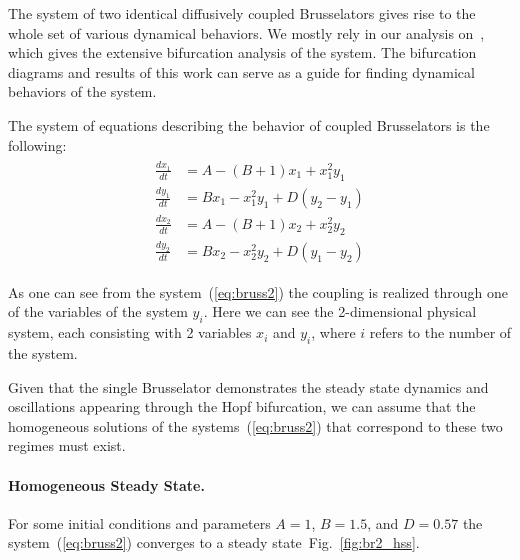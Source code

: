 \documentclass[11pt,a4paper]{article}
\begin{document}
The system of two identical diffusively coupled Brusselators gives rise to the whole
set of various dynamical behaviors. We mostly rely in our analysis
on~\cite{VolkovBruss2}, which gives the extensive bifurcation analysis of the
system. The bifurcation diagrams and results of this work can serve as a guide for
finding dynamical behaviors of the system.

The system of equations describing the behavior of coupled Brusselators is the
following:
\begin{align}
  \label{eq:bruss2}
  \begin{split}
    \frac{dx_1}{dt} &= A-(B+1)x_1+x_1^2y_1 \\
    \frac{dy_1}{dt} &= Bx_1-x_1^2y_1 + D(y_2-y_1)\\
    \frac{dx_2}{dt} &= A-(B+1)x_2+x_2^2y_2 \\
    \frac{dy_2}{dt} &= Bx_2-x_2^2y_2 + D(y_1-y_2)
  \end{split}
\end{align}

As one can see from the system~(\ref{eq:bruss2}) the coupling is realized through one
of the variables of the system $y_i$. Here we can see the 2-dimensional physical
system, each consisting with 2 variables $x_i$ and $y_i$, where $i$ refers to the
number of the system.

Given that the single Brusselator demonstrates the steady state dynamics and
oscillations appearing through the Hopf bifurcation, we can assume that the
homogeneous solutions of the systems~(\ref{eq:bruss2}) that correspond to these two
regimes must exist.

\paragraph{Homogeneous Steady State.}
\label{sec:homog-steady-stat}

For some initial conditions and parameters $A=1$, $B=1.5$, and $D=0.57$ the
system~(\ref{eq:bruss2}) converges to a steady state~Fig.~\ref{fig:br2_hss}.
\end{document}
